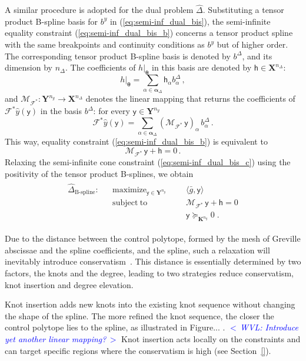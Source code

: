 \documentclass{article}
\DeclareMathOperator*{\maximize}{maximize}
\DeclareMathOperator*{\subj}{subject\;to}
\newcommand{\commentWVL}[1]{\noindent \textcolor{blue}{\emph{$<\,$WVL: #1$\,>$}}}%
\newcommand{\adj}{\ast}                     %
\newcommand{\Ppar}{{\bm{\theta}}}                   %
\newcommand{\X}{\mathbf{X}}                         %
\newcommand{\Y}{\mathbf{Y}}                         %
\newcommand{\K}{\mathbf{K}}                         %
\newcommand{\calF}{\mathcal{F}}                     %
\newcommand{\by}{b^y}               %
\newcommand{\cy}{\textsf{y}}        %
\newcommand{\ny}{{n_y}}             %
\newcommand{\Alpha}{\bm{\alpha}}    %
\newcommand{\meang}{\bar{g}}        %
\newcommand{\bDelta}{b^\Delta}          %
\newcommand{\bDeltaa}{b^\Delta_\alpha}  %
\newcommand{\nDelta}{{n_\Delta}}        %
\newcommand{\ch}{\textsf{h}}            %
\newcommand{\cha}{\textsf{h}_\alpha}    %
\newcommand{\calMFadj}{\mathcal{M}_{\mathcal{F}^\adj}}
\begin{document}
A similar procedure is adopted for the dual problem $\hat{\Delta}$. Substituting a tensor product B-spline basis for $\by$ in (\ref{eq:semi-inf_dual_bis}), the semi-infinite equality constraint (\ref{eq:semi-inf_dual_bis_b}) concerns a tensor product spline with the same breakpoints and continuity conditions as $\by$ but of higher order. The corresponding tensor product B-spline basis is denoted by $\bDelta$, and its dimension by $\nDelta$. The coefficients of $h|_\Ppar$ in this basis are denoted by $\ch\in\X^\nDelta$:
\[ h|_\Ppar = \sum_{\alpha\in\Alpha_\Delta} \cha \bDeltaa \,,%
\]
and $\calMFadj:\Y^\ny \rightarrow \X^\nDelta$ denotes the linear mapping that returns the coefficients of $\calF^\adj\hat{y}(\cy)$ in the basis $\bDelta$: for every $\cy\in\Y^\ny$
\[ \calF^\adj \hat{y}(\cy) = \sum_{\alpha\in\Alpha_\Delta} (\calMFadj \, \cy)_\alpha \, \bDeltaa\,. %
\]
This way, equality constraint (\ref{eq:semi-inf_dual_bis_b}) is equivalent to
\[ \calMFadj\,\cy + \ch = 0 \,.
\]
Relaxing the semi-infinite cone constraint (\ref{eq:semi-inf_dual_bis_c}) using the positivity of the tensor product B-splines, we obtain
\begin{gather}\label{eq:Bprog_dual}
\begin{aligned}
\hat{\Delta}_{\text{B-spline}}: && \maximize_{\cy\in\Y^\ny} &&& \langle \meang, \cy \rangle \\%
                                && \subj                    &&& \calMFadj\,\cy + \ch = 0 \\%
                                &&                          &&& \cy \succeq_{\K^\ny} 0     \;.%
\end{aligned}
\end{gather}

Due to the distance between the control polytope, formed by the mesh of
Greville abscissae and the spline coefficients, and the spline, such a
relaxation will inevitably introduce conservatism~\cite{deboor}. This distance
is essentially determined by two factors, the knots and the degree, leading to
two strategies reduce conservatism, knot insertion and degree elevation.

Knot insertion adds new knots into the existing knot sequence without changing
the shape of the spline. The more refined the knot sequence, the closer the
control polytope lies to the spline, as illustrated in Figure... .
\commentWVL{Introduce yet another linear mapping?} Knot insertion acts locally
on the constraints and can target specific regions where the conservatism is
high (see Section~\ref{}).
\end{document}
